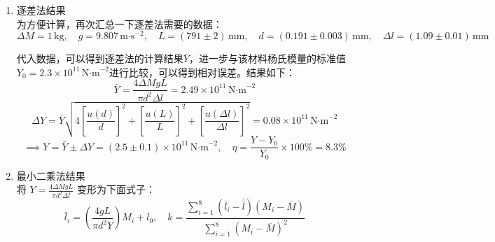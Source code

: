 \documentclass[11pt]{article}
\begin{document}
\begin{enumerate}
先计算 \( \Delta \bar{l} \) 的均值 \( \overline{\Delta \bar{l}} \)：
\[
\overline{\Delta \bar{l}} = \frac{\sum_{i=1}^{4} \Delta \bar{l}_i}{4} = \frac{1.09 + 1.07 + 1.09 + 1.10}{4} = 1.0875 \, \text{mm}
\]

\( \Delta \bar{l} \) 的测量属于多次测量，次数 \( n = 4 \)，假设 CCD 显微镜的允差 \( e = \pm 0.005 \, \text{mm} \)。简记 \( h = \Delta \bar{l} \)，则 \( \bar{h} = \overline{\Delta \bar{l}} \)，其不确定度为：
\[
u_A(h) = \sqrt{\frac{\sum_{i=1}^{4} (h_i - \bar{h})^2}{4 \times (4 - 1)}}, \quad u_{B2}(h) = \frac{e}{\sqrt{3}}
\]
\[
\implies u(h) = \sqrt{u_A^2(h) + u_{B2}^2(h)}
\]

具体计算：
\( h_1 = 1.09, h_2 = 1.07, h_3 = 1.09, h_4 = 1.10 \)，均值 \( \bar{h} = 1.0875 \)
\[
\sum_{i=1}^{4} (h_i - \bar{h})^2 = (1.09 - 1.0875)^2 + (1.07 - 1.0875)^2 + (1.09 - 1.0875)^2 + (1.10 - 1.0875)^2 = 0.000475
\]
\[
u_A(h) = \sqrt{\frac{0.000475}{12}} \approx 0.0063 \, \text{mm}
\]
\[
u_{B2}(h) = \frac{0.005}{\sqrt{3}} \approx 0.00289 \, \text{mm}
\]
\[
u(h) = \sqrt{0.0063^2 + 0.00289^2} \approx 0.007 \, \text{mm}
\]

取一位有效数字，\( u(h) = 0.01 \, \text{mm} \)，得到 \( \Delta l \) 的不确定度表示：
\[
\Delta l = (1.09 \pm 0.01) \, \text{mm}
\]

还有部分需要用到的数据，如下：
\[
\overline{M} = 1125 \, \text{g}, \quad \sum M = 9000 \, \text{g}, \quad \bar{\bar{l}} = 0.344 \, \text{mm}, \quad \bar{l} = 0.625 \, \text{mm}
\]
\item 逐差法结果 \\
为方便计算，再次汇总一下逐差法需要的数据：
\[
\Delta M = 1 \, \text{kg}, \quad g = 9.807 \, \text{m·s}^{-2}, \quad L = (791 \pm 2) \, \text{mm}, \quad d = (0.191 \pm 0.003) \, \text{mm}, \quad \Delta l = (1.09 \pm 0.01) \, \text{mm}
\]

代入数据，可以得到逐差法的计算结果\(\bar{Y}\)，进一步与该材料杨氏模量的标准值\(Y_0 = 2.3 \times 10^{11} \, \text{N·m}^{-2}\)进行比较，可以得到相对误差。结果如下：
\[
\bar{Y} = \frac{4\Delta M g L}{\pi d^2 \Delta l} = \boxed{2.49 \times 10^{11} \, \text{N·m}^{-2}}
\]
\[
\Delta Y = \bar{Y} \sqrt{4\left[\frac{u(d)}{d}\right]^2 + \left[\frac{u(L)}{L}\right]^2 + \left[\frac{u(\Delta l)}{\Delta l}\right]^2} = \boxed{0.08 \times 10^{11} \, \text{N·m}^{-2}}
\]
\[
\implies Y = \bar{Y} \pm \Delta Y = (2.5 \pm 0.1) \times 10^{11} \, \text{N·m}^{-2}, \quad \eta = \frac{Y - Y_0}{Y_0} \times 100\% = \boxed{8.3\%}
\]
    
\item 最小二乘法结果 \\
将 \( Y = \frac{4\Delta M g L}{\pi d^2 \Delta l} \) 变形为下面式子：
\[
\bar{l}_i = \left( \frac{4 g L}{\pi d^2 Y} \right) M_i + l_0, \quad k = \frac{\sum_{i=1}^{8} (\bar{l}_i - \bar{\bar{l}}) (M_i - \overline{M})}{\sum_{i=1}^{8} (M_i - \overline{M})^2} \tag{23}
\]


\end{enumerate}
\end{document}

